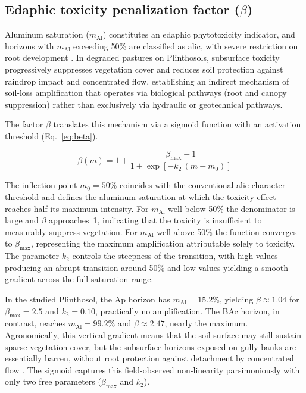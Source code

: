 \documentclass[pdflatex,sn-basic,referee,lineno]{sn-jnl}
\begin{document}
\subsection{Edaphic toxicity penalization factor (\texorpdfstring{$\beta$}{beta})}

Aluminum saturation ($m_{\mathrm{Al}}$) constitutes an edaphic phytotoxicity indicator, and horizons with $m_{\mathrm{Al}}$ exceeding 50\% are classified as alic, with severe restriction on root development \citep{embrapa_2018}. In degraded pastures on Plinthosols, subsurface toxicity progressively suppresses vegetation cover and reduces soil protection against raindrop impact and concentrated flow, establishing an indirect mechanism of soil-loss amplification that operates via biological pathways (root and canopy suppression) rather than exclusively via hydraulic or geotechnical pathways.

The factor $\beta$ translates this mechanism via a sigmoid function with an activation threshold (Eq.~\ref{eq:beta}).

\begin{equation}
\beta(m) = 1 + \frac{\beta_{\max} - 1}{1 + \exp\!\left[-k_2\,(m - m_0)\right]}
\label{eq:beta}
\end{equation}

The inflection point $m_0 = 50\%$ coincides with the conventional alic character threshold and defines the aluminum saturation at which the toxicity effect reaches half its maximum intensity. For $m_{\mathrm{Al}}$ well below 50\% the denominator is large and $\beta$ approaches~1, indicating that the toxicity is insufficient to measurably suppress vegetation. For $m_{\mathrm{Al}}$ well above 50\% the function converges to $\beta_{\max}$, representing the maximum amplification attributable solely to toxicity. The parameter $k_2$ controls the steepness of the transition, with high values producing an abrupt transition around 50\% and low values yielding a smooth gradient across the full saturation range.

In the studied Plinthosol, the Ap horizon has $m_{\mathrm{Al}} = 15.2\%$, yielding $\beta \approx 1.04$ for $\beta_{\max} = 2.5$ and $k_2 = 0.10$, practically no amplification. The BAc horizon, in contrast, reaches $m_{\mathrm{Al}} = 99.2\%$ and $\beta \approx 2.47$, nearly the maximum. Agronomically, this vertical gradient means that the soil surface may still sustain sparse vegetation cover, but the subsurface horizons exposed on gully banks are essentially barren, without root protection against detachment by concentrated flow \citep{vannoppen_2015}. The sigmoid captures this field-observed non-linearity parsimoniously with only two free parameters ($\beta_{\max}$ and $k_2$).
\end{document}
